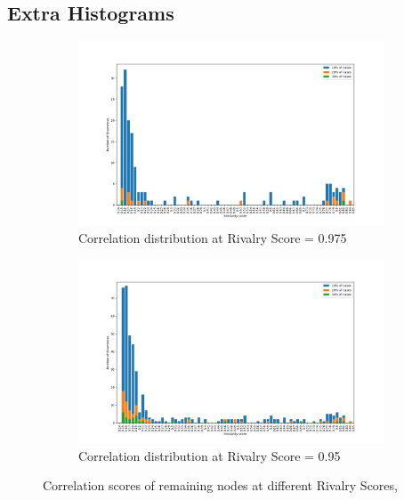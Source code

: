 \subsection{Extra Histograms}
\label{section:suppl:extra-hist}
\begin{figure}[!hptb]
	\centering
	\begin{subfigure}[b]{0.45\linewidth}
		\includegraphics[width=\linewidth]{Minor Thesis/figures/graphs/hist/Hist975.png}
		\caption{Correlation distribution at Rivalry Score = 0.975}
	\end{subfigure}
	\hfill
	\begin{subfigure}[b]{0.45\linewidth}
		\includegraphics[width=\linewidth]{Minor Thesis/figures/graphs/hist/Hist95.png}
		\caption{Correlation distribution at Rivalry Score = 0.95}
	\end{subfigure}
	\label{fig:triade-hist}
	\caption{Correlation scores of remaining nodes at different Rivalry Scores, }
\end{figure}


